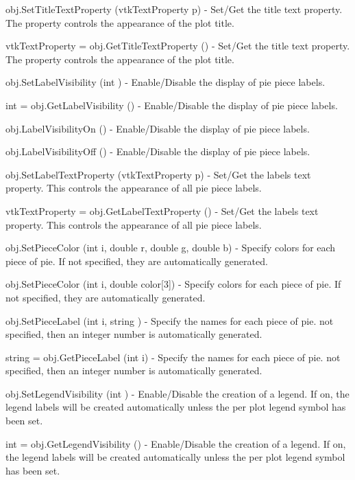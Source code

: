 \begin{DoxyItemize}
\item {\ttfamily obj.\-Set\-Title\-Text\-Property (vtk\-Text\-Property p)} -\/ Set/\-Get the title text property. The property controls the appearance of the plot title.  
\item {\ttfamily vtk\-Text\-Property = obj.\-Get\-Title\-Text\-Property ()} -\/ Set/\-Get the title text property. The property controls the appearance of the plot title.  
\item {\ttfamily obj.\-Set\-Label\-Visibility (int )} -\/ Enable/\-Disable the display of pie piece labels.  
\item {\ttfamily int = obj.\-Get\-Label\-Visibility ()} -\/ Enable/\-Disable the display of pie piece labels.  
\item {\ttfamily obj.\-Label\-Visibility\-On ()} -\/ Enable/\-Disable the display of pie piece labels.  
\item {\ttfamily obj.\-Label\-Visibility\-Off ()} -\/ Enable/\-Disable the display of pie piece labels.  
\item {\ttfamily obj.\-Set\-Label\-Text\-Property (vtk\-Text\-Property p)} -\/ Set/\-Get the labels text property. This controls the appearance of all pie piece labels.  
\item {\ttfamily vtk\-Text\-Property = obj.\-Get\-Label\-Text\-Property ()} -\/ Set/\-Get the labels text property. This controls the appearance of all pie piece labels.  
\item {\ttfamily obj.\-Set\-Piece\-Color (int i, double r, double g, double b)} -\/ Specify colors for each piece of pie. If not specified, they are automatically generated.  
\item {\ttfamily obj.\-Set\-Piece\-Color (int i, double color\mbox{[}3\mbox{]})} -\/ Specify colors for each piece of pie. If not specified, they are automatically generated.  
\item {\ttfamily obj.\-Set\-Piece\-Label (int i, string )} -\/ Specify the names for each piece of pie. not specified, then an integer number is automatically generated.  
\item {\ttfamily string = obj.\-Get\-Piece\-Label (int i)} -\/ Specify the names for each piece of pie. not specified, then an integer number is automatically generated.  
\item {\ttfamily obj.\-Set\-Legend\-Visibility (int )} -\/ Enable/\-Disable the creation of a legend. If on, the legend labels will be created automatically unless the per plot legend symbol has been set.  
\item {\ttfamily int = obj.\-Get\-Legend\-Visibility ()} -\/ Enable/\-Disable the creation of a legend. If on, the legend labels will be created automatically unless the per plot legend symbol has been set.  

\end{DoxyItemize}
